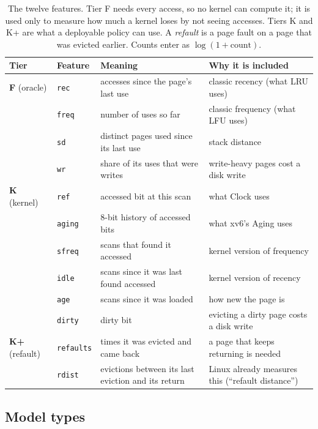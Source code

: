 \documentclass[10.5pt,a4paper]{article}
\newcommand{\code}[1]{\texttt{#1}}
\begin{document}
\begin{table}[!htbp]
\centering\small
\begin{tabularx}{\linewidth}{@{}lll>{\raggedright\arraybackslash}X@{}}
\toprule
\textbf{Tier} & \textbf{Feature} & \textbf{Meaning} & \textbf{Why it is included} \\
\midrule
\textbf{F} (oracle) & \code{rec} & accesses since the page's last use & classic recency (what LRU uses) \\
 & \code{freq} & number of uses so far & classic frequency (what LFU uses) \\
 & \code{sd} & distinct pages used since its last use & stack distance \\
 & \code{wr} & share of its uses that were writes & write-heavy pages cost a disk write \\
\midrule
\textbf{K} (kernel) & \code{ref} & accessed bit at this scan & what Clock uses \\
 & \code{aging} & 8-bit history of accessed bits & what xv6's Aging uses \\
 & \code{sfreq} & scans that found it accessed & kernel version of frequency \\
 & \code{idle} & scans since it was last found accessed & kernel version of recency \\
 & \code{age} & scans since it was loaded & how new the page is \\
 & \code{dirty} & dirty bit & evicting a dirty page costs a disk write \\
\midrule
\textbf{K+} (refault) & \code{refaults} & times it was evicted and came back & a page that keeps returning is needed \\
 & \code{rdist} & evictions between its last eviction and its return & Linux already measures this (``refault distance'') \\
\bottomrule
\end{tabularx}
\caption{The twelve features. Tier F needs every access, so no kernel can
compute it; it is used only to measure how much a kernel loses by not
seeing accesses. Tiers K and K+ are what a deployable policy can use. A
\emph{refault} is a page fault on a page that was evicted earlier. Counts
enter as $\log(1+\text{count})$.}
\label{tab:features}
\end{table}

\subsection{Model types}
\end{document}
